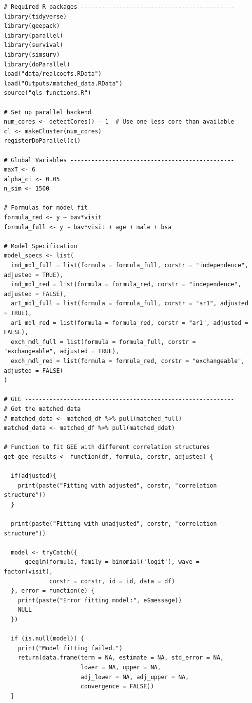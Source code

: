 \documentclass[
]{aft}
\begin{document}
\begin{verbatim}
# Required R packages --------------------------------------------
library(tidyverse)
library(geepack)
library(parallel)
library(survival)
library(simsurv)
library(doParallel) 
load("data/realcoefs.RData")
load("Outputs/matched_data.RData")
source("qls_functions.R")

# Set up parallel backend
num_cores <- detectCores() - 1  # Use one less core than available
cl <- makeCluster(num_cores)
registerDoParallel(cl)

# Global Variables -----------------------------------------------
maxT <- 6
alpha_ci <- 0.05
n_sim <- 1500

# Formulas for model fit 
formula_red <- y ~ bav*visit 
formula_full <- y ~ bav*visit + age + male + bsa

# Model Specification 
model_specs <- list(
  ind_mdl_full = list(formula = formula_full, corstr = "independence", adjusted = TRUE),
  ind_mdl_red = list(formula = formula_red, corstr = "independence", adjusted = FALSE),
  ar1_mdl_full = list(formula = formula_full, corstr = "ar1", adjusted = TRUE),
  ar1_mdl_red = list(formula = formula_red, corstr = "ar1", adjusted = FALSE),
  exch_mdl_full = list(formula = formula_full, corstr = "exchangeable", adjusted = TRUE),
  exch_mdl_red = list(formula = formula_red, corstr = "exchangeable", adjusted = FALSE)
)

# GEE ------------------------------------------------------------
# Get the matched data
# matched_data <- matched_df %>% pull(matched_full)
matched_data <- matched_df %>% pull(matched_ddat)

# Function to fit GEE with different correlation structures 
get_gee_results <- function(df, formula, corstr, adjusted) {
  
  if(adjusted){
    print(paste("Fitting with adjusted", corstr, "correlation structure"))
  }
  
  print(paste("Fitting with unadjusted", corstr, "correlation structure"))
  
  model <- tryCatch({
      geeglm(formula, family = binomial('logit'), wave = factor(visit),
             corstr = corstr, id = id, data = df)
  }, error = function(e) {
    print(paste("Error fitting model:", e$message))
    NULL
  })
  
  if (is.null(model)) {
    print("Model fitting failed.")
    return(data.frame(term = NA, estimate = NA, std_error = NA, 
                      lower = NA, upper = NA, 
                      adj_lower = NA, adj_upper = NA, 
                      convergence = FALSE))
  }
  

\end{verbatim}
\end{document}

